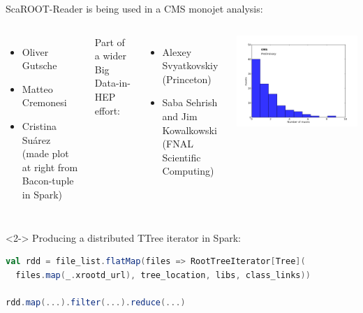 \documentclass{beamer}
\begin{document}
\begin{frame}[fragile]{}
\hspace{-0.6 cm}ScaROOT-Reader is being used in a CMS monojet analysis:
\begin{columns}
\begin{itemize}
\item Oliver Gutsche
\item Matteo Cremonesi
\item Cristina Su\'arez (made plot at right from Bacon-tuple in Spark)
\end{itemize}

\vspace{0.5 cm}
Part of a wider Big Data-in-HEP effort:
\begin{itemize}
\item Alexey Svyatkovskiy (Princeton)
\item Saba Sehrish and Jim Kowalkowski (FNAL Scientific Computing)
\end{itemize}
\includegraphics[width=\linewidth]{THE_PLOT.png}
\end{columns}

\vspace{0.5 cm}
\begin{uncoverenv}<2->
\hspace{-0.6 cm}Producing a distributed TTree iterator in Spark:

\begin{lstlisting}[language=scala]
val rdd = file_list.flatMap(files => RootTreeIterator[Tree](
  files.map(_.xrootd_url), tree_location, libs, class_links))

rdd.map(...).filter(...).reduce(...)
\end{lstlisting}
\end{uncoverenv}
\end{frame}
\end{document}
